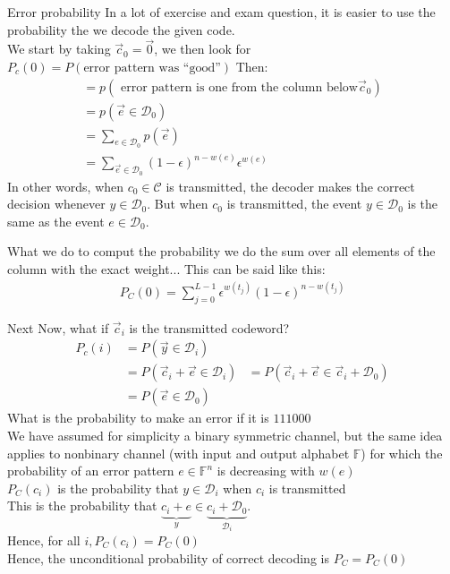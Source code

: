 \begin{parag}{Error probability}
In a lot of exercise and exam question, it is easier to use the probability the we decode  the given code.\\
We start by taking $\vec{c}_0 = \vec{0}$, we then look for $P_c\left(0\right) =  P\left(\text{error pattern was ``good''}\right)$
Then:
\begin{align*} 
    =p\left(\text{ error pattern is one from the column below} \vec{c}_0\right)\\
    = p\left(\vec{e} \in \mathcal{D}_0\right)\\
    = \sum_{e \in \mathcal{D}_0} p\left(\vec{e}\right)\\
    = \sum_{\vec{e}\in \mathcal{D}_0}\left(1-\epsilon\right)^{n-w\left(e\right)}\epsilon^{w\left(e\right)}
\end{align*}
In other words, when $c_0 \in \mathcal{C}$ is transmitted, the decoder makes the correct decision whenever $y \in \mathcal{D}_0$. But when $c_0$ is transmitted, the event $y \in \mathcal{D}_0$ is the same as the event $e \in \mathcal{D}_0$. 
\begin{framedremark}
What we do to comput the probability we do the sum over all elements of the column with the exact weight... This  can be said like this:
\begin{align*} P_C\left(0\right) =  \sum_{j= 0}^{L-1} \epsilon^{w\left(t_j\right)}\left(1-\epsilon\right)^{n-w\left(t_j\right)} \end{align*}
\end{framedremark}
\end{parag}


\begin{parag}{Next}
    Now, what if $\vec{c}_i$ is the transmitted codeword?
    \begin{align*} 
        P_c\left(i\right) &= P\left(\vec{y} \in \mathcal{D}_i\right)\\
                          &= P\left(\vec{c}_i + \vec{e} \in \mathcal{D}_i\right)
                          &= P\left(\vec{c}_i + \vec{e} \in \vec{c}_i + \mathcal{D}_0\right)\\
                          &= P\left(\vec{e} \in \mathcal{D}_0\right)
    \end{align*}
    What is the probability to make an error if it is $111000$\\
    We have assumed for simplicity a binary symmetric channel, but the same idea applies to nonbinary channel (with input and output alphabet $\mathbb{F}$) for which the probability of an error pattern $e \in \mathbb{F}^n$ is decreasing with $w\left(e\right)$\\
    $P_C\left(c_i\right)$ is the probability that $y \in \mathcal{D}_i$ when $c_i$ is transmitted\\
    This is the probability that $\underbrace{c_i + e}_{y} \in \underbrace{c_i + \mathcal{D}_0}_{\mathcal{D}_i}$.\\
    Hence, for all $i, P_C\left(c_i\right) =  P_C\left(0\right)$\\
    Hence, the unconditional probability of correct decoding is $P_C = P_C\left(0\right)$
\end{parag}


